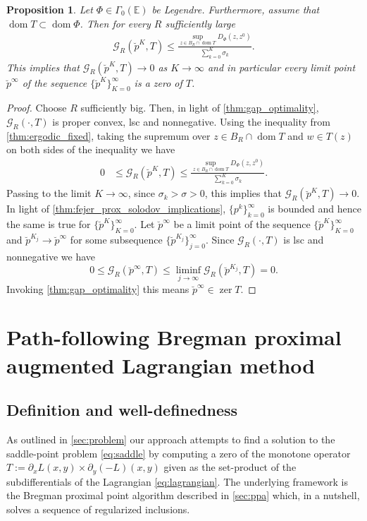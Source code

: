 \documentclass[11pt,onecolumn]{article}
\DeclareMathOperator{\dom}{dom}
\DeclareMathOperator{\zer}{zer}
\newtheorem{proposition}[proposition]{Proposition}
\theoremstyle{remark}
\begin{document}
\begin{proposition}
    Let $\Phi \in \Gamma_0(\mathbb{E})$ be Legendre. Furthermore, assume that $\dom T \subset \dom \Phi$.
    Then for every $R$ sufficiently large
   \begin{align}
    \mathcal{G}_R(\breve p^K, T) \leq  \frac{\sup_{z \in B_R \cap \dom T} D_\Phi(z,z^0)}{\sum_{k=0}^K \sigma_k}.
\end{align}
    This implies that $
    \mathcal{G}_R(\breve p^K, T) \to 0$
    as $K \to \infty$ and in particular every limit point $\breve p^\infty$ of the sequence $\{\breve p^K\}_{K=0}^\infty$ is a zero of $T$.
\end{proposition}
\begin{proof}
Choose $R$ sufficiently big. Then, in light of \cref{thm:gap_optimality}, $\mathcal{G}_R(\cdot, T)$ is proper convex, lsc and nonnegative.
Using the inequality from \cref{thm:ergodic_fixed}, taking the supremum over $z \in B_R \cap \dom T$ and $w \in T(z)$ on both sides of the inequality we have
\begin{align}
    0 &\leq \mathcal{G}_R(\breve p^K, T) \leq  \frac{\sup_{z \in B_R\cap \dom T} D_\Phi(z,z^0)}{\sum_{k=0}^K \sigma_k}.
\end{align}
Passing to the limit $K \to \infty$, since $\sigma_k > \sigma > 0$, this implies that $\mathcal{G}_R(\breve p^K, T) \to 0$.
In light of \cref{thm:fejer_prox_solodov_implications}, $\{p^k\}_{k=0}^\infty$ is bounded and hence the same is true for $\{\breve p^K\}_{K=0}^\infty$. 
Let $\breve p^\infty$ be a limit point of the sequence $\{\breve p^K\}_{K=0}^\infty$ and $\breve p^{K_j} \to \breve p^\infty$ for some subsequence $\{\breve p^{K_j}\}_{j=0}^\infty$.
Since $\mathcal{G}_R(\cdot, T)$ is lsc and nonnegative we have
\[
0 \leq \mathcal{G}_R(\breve p^\infty, T) \leq \liminf_{j \to \infty} \mathcal{G}_R(\breve p^{K_j}, T) = 0.
\]
Invoking \cref{thm:gap_optimality} this means $\breve p^\infty \in \zer T$.
\end{proof}



\section{Path-following Bregman proximal augmented Lagrangian method} \label{sec:path_following_balm}
\subsection{Definition and well-definedness}
As outlined in \cref{sec:problem} our approach attempts to find a solution to the saddle-point problem \cref{eq:saddle} by computing a zero of the monotone operator $T:=\partial_x L(x,y) \times \partial_y (-L)(x,y)$ given as the set-product of the subdifferentials of the Lagrangian \cref{eq:lagrangian}.
The underlying framework is the Bregman proximal point algorithm described in \cref{sec:ppa} which, in a nutshell, solves a sequence of regularized inclusions. 
\end{document}

